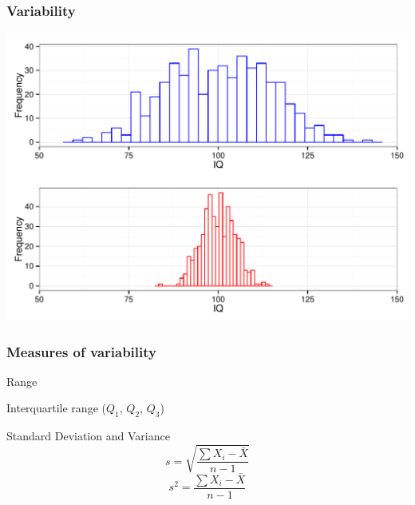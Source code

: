 \documentclass[dvipsnames]{beamer}\usepackage[]{graphicx}\usepackage[]{color}
\makeatletter
\def\maxwidth{ %
  \ifdim\Gin@nat@width>\linewidth
    \linewidth
  \else
    \Gin@nat@width
  \fi
}
\newenvironment{knitrout}{}{} %
\makeatother
\begin{document}
\begin{frame}
\frametitle{Variability}
\begin{knitrout}
\color{fgcolor}

{\centering \includegraphics[width=\maxwidth]{figure/unnamed-chunk-7-1} 

}



\end{knitrout}
\end{frame}

\begin{frame}
\frametitle{Measures of variability}

Range

\vspace{.5cm}

Interquartile range ($Q_1$, $Q_2$, $Q_3$)

\vspace{.5cm}

Standard Deviation and Variance
$$
s = \sqrt{\frac{\sum{X_i - \bar{X}}}{n - 1}}
$$
$$
s^2 = \frac{\sum{X_i - \bar{X}}}{n - 1}
$$
\end{frame}
\end{document}
